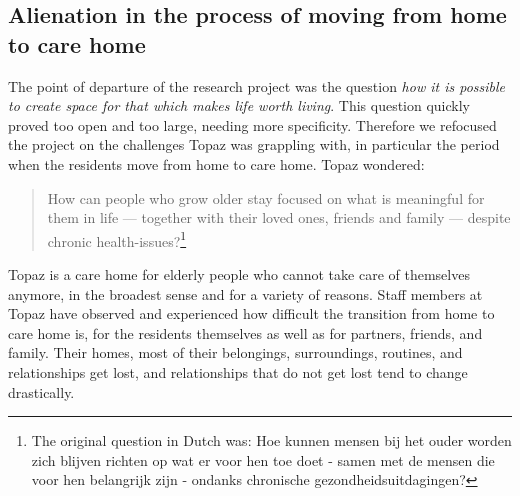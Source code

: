 \documentclass[authordate, empirical,issue]{jote-new-article}
\begin{document}
	\subsection{Alienation in the process of moving from home to care home}



	The point of departure of the research project was the question \emph{how it is possible to create space for that which makes life worth living}. This question quickly proved too open and too large, needing more specificity. Therefore we refocused the project on the challenges Topaz was grappling with, in particular the period when the residents move from home to care home. Topaz wondered:





	\begin{quote}
		
		How can people who grow older stay focused on what is meaningful for them in life — together with their loved ones, friends and family — despite chronic health-issues?\footnote{ The original question in Dutch was: Hoe kunnen mensen bij het ouder worden zich blijven richten op wat er voor hen toe doet - samen met de mensen die voor hen belangrijk zijn - ondanks chronische gezondheidsuitdagingen?}
	\end{quote}









	Topaz is a care home for elderly people who cannot take care of themselves anymore, in the broadest sense and for a variety of reasons. Staff members at Topaz have observed and experienced how difficult the transition from home to care home is, for the residents themselves as well as for partners, friends, and family. Their homes, most of their belongings, surroundings, routines, and relationships get lost, and relationships that do not get lost tend to change drastically.
\end{document}
